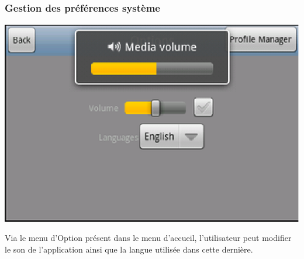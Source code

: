 	\subsubsection{Gestion des préférences système}
		\begin{center}						
			\includegraphics[scale=0.6]{Developpement/Img/4.eps}
		\end{center}
	Via le menu d'Option présent dans le menu d'accueil, l'utilisateur peut
	modifier le son de l'application ainsi que la langue utilisée dans cette
	dernière.
	
